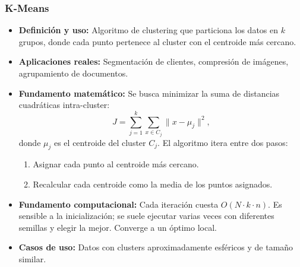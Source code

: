 \documentclass[12pt,a4paper,openany,oneside]{book}
\begin{document}
\subsubsection{K-Means}
\begin{itemize}
    \item \textbf{Definición y uso:} Algoritmo de clustering que particiona los datos en \(k\) grupos, donde cada punto pertenece al cluster con el centroide más cercano.
    \item \textbf{Aplicaciones reales:} Segmentación de clientes, compresión de imágenes, agrupamiento de documentos.
    \item \textbf{Fundamento matemático:} Se busca minimizar la suma de distancias cuadráticas intra-cluster:
    \[
    J = \sum_{j=1}^k \sum_{x \in C_j} \|x - \mu_j\|^2,
    \]
    donde \(\mu_j\) es el centroide del cluster \(C_j\). El algoritmo itera entre dos pasos:
    \begin{enumerate}
        \item Asignar cada punto al centroide más cercano.
        \item Recalcular cada centroide como la media de los puntos asignados.
    \end{enumerate}
    \item \textbf{Fundamento computacional:} Cada iteración cuesta \(O(N \cdot k \cdot n)\). Es sensible a la inicialización; se suele ejecutar varias veces con diferentes semillas y elegir la mejor. Converge a un óptimo local.
    \item \textbf{Casos de uso:} Datos con clusters aproximadamente esféricos y de tamaño similar.
\end{itemize}
\end{document}
